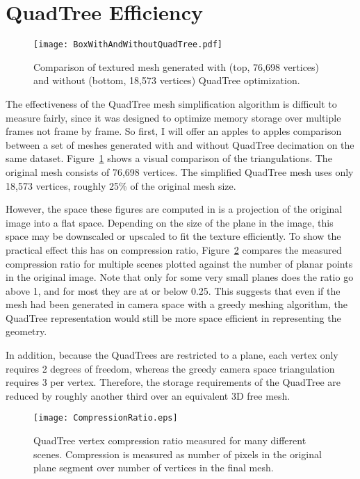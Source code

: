 \section{QuadTree Efficiency}
\begin{figure}[!htpb]
    \centering
    \texttt{[image: BoxWithAndWithoutQuadTree.pdf]}
    \caption{Comparison of textured mesh generated with (top, 76,698 vertices) and without (bottom, 18,573 vertices) QuadTree optimization.}
    \label{fig:withwithoutquadtree}
\end{figure}
The effectiveness of the QuadTree mesh simplification algorithm is difficult to measure fairly, since it was designed to optimize memory storage over multiple frames not frame by frame. So first, I will offer an apples to apples comparison between a set of meshes generated with and without QuadTree decimation on the same dataset. Figure~\ref{fig:withwithoutquadtree} shows a visual comparison of the triangulations. The original mesh consists of 76,698 vertices. The simplified QuadTree mesh uses only 18,573 vertices, roughly 25\% of the original mesh size.\par
However, the space these figures are computed in is a projection of the original image into a flat space. Depending on the size of the plane in the image, this space may be downscaled or upscaled to fit the texture efficiently. To show the practical effect this has on compression ratio, Figure~\ref{fig:compressionratio} compares the measured compression ratio for multiple scenes plotted against the number of planar points in the original image. Note that only for some very small planes does the ratio go above 1, and for most they are at or below 0.25.  This suggests that even if the mesh had been generated in camera space with a greedy meshing algorithm, the QuadTree representation would still be more space efficient in representing the geometry.\par
In addition, because the QuadTrees are restricted to a plane, each vertex only requires 2 degrees of freedom, whereas the greedy camera space triangulation requires 3 per vertex. Therefore, the storage requirements of the QuadTree are reduced by roughly another third over an equivalent 3D free mesh.\par 


\begin{figure}[!htpb]
    \centering
    \texttt{[image: CompressionRatio.eps]}
    \caption{QuadTree vertex compression ratio measured for many different scenes. Compression is measured as number of pixels in the original plane segment over number of vertices in the final mesh.}
    \label{fig:compressionratio}
\end{figure}



